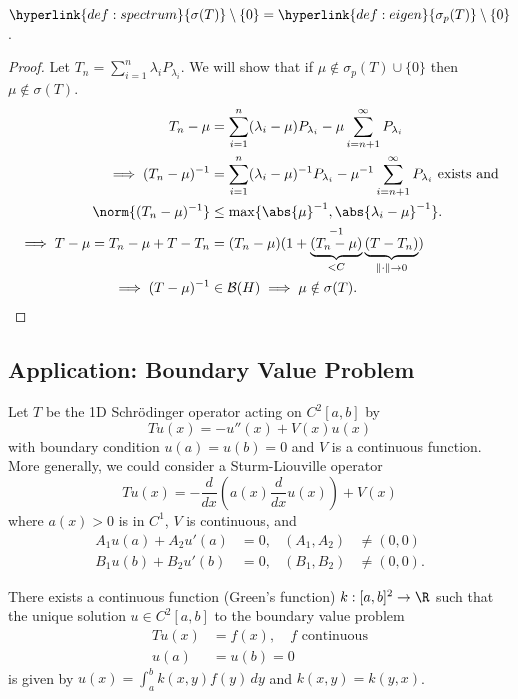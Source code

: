 \documentclass{article}
\begin{document}
\begin{cor}
    $\hyperlink{def:spectrum}{\sigma(T)} \setminus \{0\} = \hyperlink{def:eigen}{\sigma_p(T)} \setminus \{0\}$.
\end{cor}

\begin{proof}
    Let $T_n = \sum_{i=1}^n \lambda_i P_{\lambda_i}$. We will show that if $\mu \notin \sigma_p(T) \cup \{0\}$ then $\mu \notin \sigma(T)$.
    \begin{align*}
        T_n - \mu &= \sum_{i=1}^n (\lambda_i - \mu) P_{\lambda_i} - \mu \sum_{i=n+1}^\infty P_{\lambda_i} \\
        \implies (T_n - \mu)^{-1} &= \sum_{i=1}^n (\lambda_i - \mu)^{-1} P_{\lambda_i} - \mu^{-1} \sum_{i=n+1}^\infty P_{\lambda_i} \text{ exists and} \\
        \norm{(T_n - \mu)^{-1}} &\leq \max\{\abs{\mu}^{-1}, \abs{\lambda_i-\mu}^{-1}\}. \\
        \implies T - \mu = T_n - \mu + T - T_n &= (T_n - \mu)(1 + \underbrace{(T_n - \mu)}_{<C}^{-1}\underbrace{(T-T_n)}_{\|\cdot\| \to 0}) \\
        \implies (T-\mu)^{-1} &\in \mathcal{B}(H) \implies \mu \notin \sigma(T). \qedhere
    \end{align*}
\end{proof}

\subsection{Application: Boundary Value Problem}
Let $T$ be the 1D Schr\"odinger operator acting on $C^2[a,b]$ by
\begin{equation*}
    Tu(x) = -u''(x) + V(x) u(x)
\end{equation*}
with boundary condition $u(a) = u(b) = 0$ and $V$ is a continuous function.
More generally, we could consider a Sturm-Liouville operator
\[Tu(x) = -\frac{d}{dx}\left(a(x) \frac{d}{dx} u(x)\right) + V(x)\]
where $a(x)>0$ is in $C^1$, $V$ is continuous, and
\begin{align*}
    A_1 u(a) + A_2 u'(a) &= 0, & (A_1, A_2) &\neq (0,0) \\
    B_1 u(b) + B_2 u'(b) &= 0, & (B_1, B_2) &\neq (0,0).
\end{align*}

\begin{thm}
    There exists a continuous function (Green's function) $k: [a,b]^2 \to \R$ such that the unique solution $u \in C^2 [a,b]$ to the boundary value problem
    \begin{equation}
    \begin{aligned}
        Tu(x) &= f(x), \quad f \text{ continuous} \\
        u(a) &= u(b) = 0
    \end{aligned}
    \tag{$*$}\label{eq:23star}
    \end{equation}
    is given by $u(x) = \int_a^b k(x,y) f(y) \, dy$ and $k(x,y) = k(y,x)$.
\end{thm}
\end{document}

